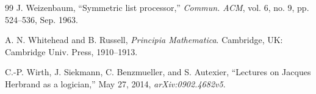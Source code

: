 \documentclass[journal]{IEEEtran}
\begin{document}
\begin{thebibliography}{99}
 J. Weizenbaum, ``Symmetric list processor,''
  \textit{Commun. ACM}, vol. 6, no. 9, pp. 524--536, Sep. 1963.

 A. N. Whitehead and B. Russell,
  \textit{Principia Mathematica}. Cambridge, UK: Cambridge
  Univ. Press, 1910--1913.

 C.-P. Wirth, J. Siekmann,
  C. Benzmueller, and S. Autexier,
  ``Lectures on Jacques Herbrand as a logician,''
  May 27, 2014, \textit{arXiv:0902.4682v5}.

\end{thebibliography}

%
% 
\end{document}
